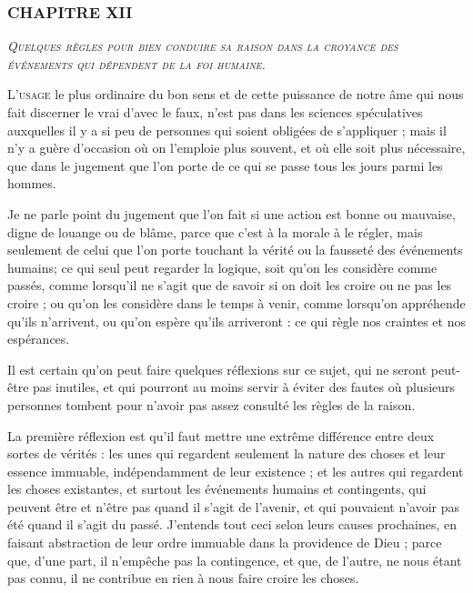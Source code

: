 \subsubsection{\centering \Large CHAPITRE XII}
\begin{center}\emph{\large\scshape Quelques règles pour bien conduire sa raison dans la croyance des événements qui dépendent de la foi humaine.}\end{center}

	\lettrine{L}{'usage} le plus ordinaire du bon sens et de cette puissance de notre âme qui nous fait discerner le vrai d'avec le faux, n'est pas dans les sciences spéculatives auxquelles il y a si peu de personnes qui soient obligées de s'appliquer ; mais il n'y a guère d'occasion où on l'emploie plus souvent, et où elle soit plus nécessaire, que dans le jugement que l'on porte de ce qui se passe tous les jours parmi les hommes.

Je ne parle point du jugement que l'on fait si une action est bonne ou mauvaise, digne de louange ou de blâme, parce que c'est à la morale à le régler, mais seulement de celui que l'on porte touchant la vérité ou la fausseté des événements humains; ce qui seul peut regarder la logique, soit qu'on les considère comme passés, comme lorsqu'il ne s'agit que de savoir si on doit les croire ou ne pas les croire ; ou qu'on les considère dans le temps à venir, comme lorsqu'on appréhende qu'ils n'arrivent, ou qu'on espère qu'ils arriveront : ce qui règle nos craintes et nos espérances.

Il est certain qu'on peut faire quelques réflexions sur ce sujet, qui ne seront peut-être pas inutiles, et qui pourront au moins servir à éviter des fautes où plusieurs personnes tombent pour n'avoir pas assez consulté les règles de la raison.

La première réflexion est qu'il faut mettre une extrême différence entre deux sortes de vérités : les unes qui regardent seulement la nature des choses et leur essence immuable, indépendamment de leur existence ; et les autres qui regardent les choses existantes, et surtout les événements humains et contingents, qui peuvent être et n'être pas quand il s'agit de l'avenir, et qui pouvaient n'avoir pas été quand il s'agit du passé. J'entends tout ceci selon leurs causes prochaines, en faisant abstraction de leur ordre immuable dans la providence de Dieu ; parce que, d'une part, il n'empêche pas la contingence, et que, de l'autre, ne nous étant pas connu, il ne contribue en rien à nous faire croire les choses.

